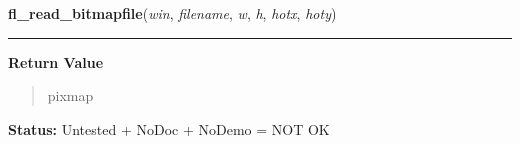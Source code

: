     \label{xformslib:flbitmap:fl_read_bitmapfile}

    \vspace{0.5ex}

\hspace{.8\funcindent}\begin{boxedminipage}{\funcwidth}

    \raggedright \textbf{fl\_read\_bitmapfile}(\textit{win}, \textit{filename}, \textit{w}, \textit{h}, \textit{hotx}, \textit{hoty})

    \vspace{-1.5ex}

    \rule{\textwidth}{0.5\fboxrule}
\setlength{\parskip}{2ex}
\setlength{\parskip}{1ex}
      \textbf{Return Value}
    \vspace{-1ex}

      \begin{quote}
      pixmap

      \end{quote}

\textbf{Status:} Untested + NoDoc + NoDemo = NOT OK



    \end{boxedminipage}

    \label{xformslib:flbitmap:fl_create_from_bitmapdata}

    \vspace{0.5ex}

